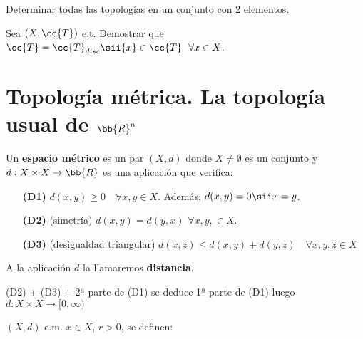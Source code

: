 \begin{ejemplo}
    \begin{ejercicio}
        Determinar todas las topologías en un conjunto con 2 elementos.

    \end{ejercicio}

    \begin{ejercicio}
        Sea $(X, \cc{T})$ e.t. Demostrar que $\cc{T}=\cc{T}_{disc} \sii \{x\}\in \cc{T}\ \  \forall x \in X$. 
    \end{ejercicio}

    \vspace*{0.5cm}

    \section*{Topología métrica. La topología usual de $\bb{R}^n$}

    \begin{definicion}
        Un \textbf{espacio métrico} es un par $(X, d)$ donde $X \neq \emptyset$ es un conjunto y $d: X \times X \rightarrow \bb{R}$ es una aplicación que verifica:
    \end{definicion}

    \begin{enumerate}
        \item [\textbf{(\hypertarget{D1}{D1})}] $d(x, y) \geq 0$\ \ $\forall x,y \in X$. Además, $d(x,y)= 0 \sii x=y$.
        \item [\textbf{(\hypertarget{D2}{D2})}] (simetría) $d(x,y)=d(y,x)$ $\forall x, y, \in X.$
        \item [\textbf{(\hypertarget{D3}{D3})}] (desigualdad triangular) $d(x,z) \leq d(x,y) + d(y,z)$\ \ $\forall x,y,z \in X$
    \end{enumerate}

    A la aplicación $d$ la llamaremos \textbf{distancia}.

    \begin{ejercicio}
        (D2) + (D3) + 2ª parte de (D1) se deduce 1ª parte de (D1) luego $d:X \times X \rightarrow [0, \infty)$
    \end{ejercicio}

   \begin{definicion}
        $(X,d)$ e.m. $x \in X$, $r >0$, se definen:


\end{definicion}
\end{ejemplo}
